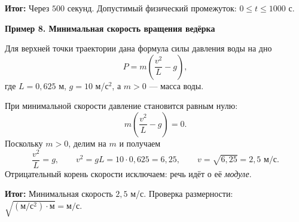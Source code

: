 \documentclass[a4paper,12pt]{article}
\newcommand{\result}[1]{\textcolor{darkaccent}{\textbf{Итог:}} #1}
\newcommand{\ex}[2]{\vspace{4pt}\noindent\textcolor{darkaccent}{\textbf{Пример #1. #2}}\par\nopagebreak[3]}
\begin{document}
\result{Через $500$ секунд. Допустимый физический промежуток: $0\le t\le1000$ с.}

\ex{8}{Минимальная скорость вращения ведёрка}
Для верхней точки траектории дана формула силы давления воды на дно
\[
 P=m\left(\frac{v^2}{L}-g\right),
\]
где $L=0{,}625$ м, $g=10$ м/с$^2$, а $m>0$ --- масса воды.

При минимальной скорости давление становится равным нулю:
\[
 m\left(\frac{v^2}{L}-g\right)=0.
\]
Поскольку $m>0$, делим на $m$ и получаем
\[
 \frac{v^2}{L}=g,\qquad
 v^2=gL=10\cdot0{,}625=6{,}25,
 \qquad v=\sqrt{6{,}25}=2{,}5\text{ м/с}.
\]
Отрицательный корень скорости исключаем: речь идёт о её \emph{модуле}.

\result{Минимальная скорость $2{,}5$ м/с. Проверка размерности: $\sqrt{(\text{м}/\text{с}^2)\cdot\text{м}}=\text{м}/\text{с}$.}
\end{document}
